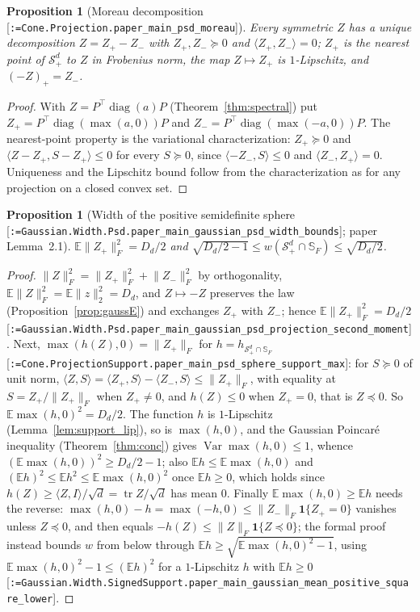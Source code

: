 \documentclass[11pt]{article}
\makeatletter
\newcommand{\formal@break}[1]{\@tfor\formal@tok:=#1\do{%
  \formal@tok
  \expandafter\ifx\formal@tok.\allowbreak\else
  \expandafter\ifx\formal@tok\_\allowbreak\fi\fi}}
\DeclareRobustCommand{\formal}[1]{\textnormal{[\texttt{\small\formal@break{#1}}]}}
\newcommand{\E}{\mathbb{E}}
\newcommand{\Spsd}{\mathcal{S}_{+}}
\newcommand{\ip}[2]{\langle #1, #2\rangle}
\newcommand{\norm}[1]{\lVert #1\rVert}
\newcommand{\tr}{\operatorname{tr}}
\newcommand{\Fro}{F}
\newcommand{\sqd}{\sqrt{d}}
\newcommand{\Id}{I}
\newcommand{\Dd}{D}
\newcommand{\one}{\mathbf{1}}
\newcommand{\diag}{\operatorname{diag}}
\theoremstyle{plain}
\newtheorem{proposition}[theorem]{Proposition}
\theoremstyle{definition}
\makeatother
\begin{document}
\begin{proposition}[Moreau decomposition \formal{Cone.Projection.paper\_main\_psd\_moreau}]\label{prop:moreau}
Every symmetric $Z$ has a unique decomposition $Z = Z_+ - Z_-$ with
$Z_+, Z_- \succeq 0$ and $\ip{Z_+}{Z_-} = 0$; $Z_+$ is the nearest point of
$\Spsd^d$ to $Z$ in Frobenius norm, the map $Z \mapsto Z_+$ is
$1$-Lipschitz, and $(-Z)_+ = Z_-$.
\end{proposition}

\begin{proof}
With $Z = P^{\top}\diag(a)P$ (Theorem~\ref{thm:spectral}) put
$Z_+ = P^{\top}\diag(\max(a,0))P$ and $Z_- = P^{\top}\diag(\max(-a,0))P$.
The nearest-point property is the variational characterization:
$Z_+ \succeq 0$ and $\ip{Z - Z_+}{S - Z_+} \le 0$ for every $S \succeq 0$,
since $\ip{-Z_-}{S} \le 0$ and $\ip{Z_-}{Z_+} = 0$. Uniqueness and the
Lipschitz bound follow from the characterization as for any projection on
a closed convex set.
\end{proof}

\begin{proposition}[Width of the positive semidefinite sphere \formal{Gaussian.Width.Psd.paper\_main\_gaussian\_psd\_width\_bounds}; paper Lemma~2.1]\label{prop:psdwidth}
$\E\norm{Z_+}_\Fro^2 = \Dd_d/2$ and
$\sqrt{\Dd_d/2 - 1} \le w(\Spsd^d \cap \mathbb{S}_\Fro) \le \sqrt{\Dd_d/2}$.
\end{proposition}

\begin{proof}
$\norm{Z}_\Fro^2 = \norm{Z_+}_\Fro^2 + \norm{Z_-}_\Fro^2$ by orthogonality,
$\E\norm{Z}_\Fro^2 = \E\norm{z}_2^2 = \Dd_d$, and $Z \mapsto -Z$ preserves
the law (Proposition~\ref{prop:gaussE}) and exchanges $Z_+$ with $Z_-$;
hence $\E\norm{Z_+}_\Fro^2 = \Dd_d/2$
\formal{Gaussian.Width.Psd.paper\_main\_gaussian\_psd\_projection\_second\_moment}.
Next, $\max(h(Z), 0) = \norm{Z_+}_\Fro$ for $h = h_{\Spsd^d\cap\mathbb{S}_\Fro}$
\formal{Cone.ProjectionSupport.paper\_main\_psd\_sphere\_support\_max}:
for $S \succeq 0$ of unit norm, $\ip{Z}{S} = \ip{Z_+}{S} - \ip{Z_-}{S} \le \norm{Z_+}_\Fro$,
with equality at $S = Z_+/\norm{Z_+}_\Fro$ when $Z_+ \ne 0$, and $h(Z) \le 0$
when $Z_+ = 0$, that is $Z \preceq 0$. So $\E\max(h,0)^2 = \Dd_d/2$. The
function $h$ is $1$-Lipschitz (Lemma~\ref{lem:support_lip}), so is
$\max(h, 0)$, and the Gaussian Poincar\'e inequality (Theorem~\ref{thm:conc})
gives $\operatorname{Var}\max(h,0) \le 1$, whence
$(\E\max(h,0))^2 \ge \Dd_d/2 - 1$; also $\E h \le \E\max(h,0)$ and
$(\E h)^2 \le \E h^2 \le \E\max(h,0)^2$ once $\E h \ge 0$, which holds since
$h(Z) \ge \ip{Z}{\Id}/\sqd = \tr Z/\sqd$ has mean $0$. Finally
$\E\max(h,0) \ge \E h$ needs the reverse: $\max(h,0) - h = \max(-h, 0) \le \norm{Z_-}_\Fro \one\{Z_+ = 0\}$
vanishes unless $Z \preceq 0$, and then equals $-h(Z) \le \norm{Z}_\Fro\one\{Z\preceq 0\}$;
the formal proof instead bounds $w$ from below through
$\E h \ge \sqrt{\E\max(h,0)^2 - 1}$, using $\E\max(h,0)^2 - 1 \le (\E h)^2$
for a $1$-Lipschitz $h$ with $\E h \ge 0$
\formal{Gaussian.Width.SignedSupport.paper\_main\_gaussian\_mean\_positive\_square\_lower}.
\end{proof}
\end{document}
